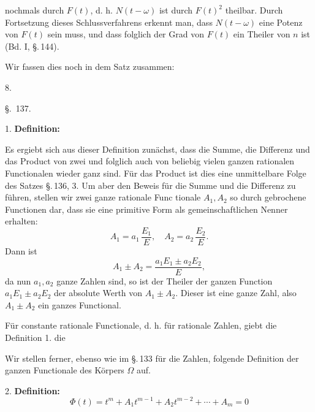 nochmals durch $F(t)$, d. h. $N(t-\omega)$ ist durch $F(t)^2$ theilbar.
Durch Fortsetzung dieses Schlussverfahrens erkennt man, dass
$N(t-\omega)$ eine Potenz von $F(t)$ sein muss, und dass folglich der
Grad von $F(t)$ ein Theiler von $n$ ist (Bd. I, \S.\,144).

Wir fassen dies noch in dem Satz zusammen:

8. 

\begin{center}
\S.\ 137.

\end{center}

1. \textbf{Definition:} 

Es ergiebt sich aus dieser Definition zunächst, dass die
Summe, die Differenz und das Product von zwei und folglich
auch von beliebig vielen ganzen rationalen Functionalen wieder
ganz sind. Für das Product ist dies eine unmittelbare Folge
des Satzes \S.\,136, 3. Um aber den Beweis für die Summe und
die Differenz zu führen, stellen wir zwei ganze rationale Func\-
tionale $A_1, A_2$ so durch gebrochene Functionen dar, dass sie eine
primitive Form als gemeinschaftlichen Nenner erhalten:
\[
A_1 = a_1\,\frac{E_1}{E}, \quad A_2 = a_2\,\frac{E_2}{E}.
\]
Dann ist
\[
A_1 \pm A_2 = \frac{a_1 E_1 \pm a_2 E_2}{E},
\]
da nun $a_1, a_2$ ganze Zahlen sind, so ist der Theiler der ganzen
Function $a_1 E_1 \pm a_2 E_2$ der absolute Werth von $A_1 \pm A_2$. Dieser
ist eine ganze Zahl, also $A_1 \pm A_2$ ein ganzes Functional.

Für constante rationale Functionale, d. h. für rationale
Zahlen, giebt die Definition 1. die 

Wir stellen ferner, ebenso wie im \S.\,133 für die Zahlen,
folgende Definition der ganzen Functionale des Körpers $\Omega$ auf.

2. \textbf{Definition:} 
\[
\Phi(t) = t^m + A_1 t^{m-1} + A_2 t^{m-2} + \cdots + A_m = 0
\]
